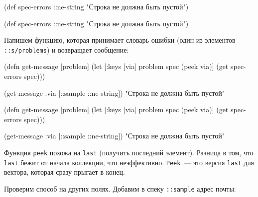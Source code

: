 \label{spec-errors}

\ifx\DEVICETYPE\MOBILE

  \begin{clojure}
(def spec-errors
  {::ne-string
   "Строка не должна быть пустой"})
  \end{clojure}

\else

  \begin{clojure}
(def spec-errors
  {::ne-string "Строка не должна быть пустой"})
  \end{clojure}

\fi

\mnoindent
Напишем функцию, которая принимает словарь ошибки (один из элементов
\verb|::s/problems|) и возвращает сообщение:


\ifx\DEVICETYPE\MOBILE

  \begin{clojure}
(defn get-message [problem]
  (let [{:keys [via]} problem
        spec (peek via)]
    (get spec-errors spec)))

(get-message {:via [::sample
                    ::ne-string]})
"Строка не должна быть пустой"
  \end{clojure}

\else

  \begin{clojure}
(defn get-message [problem]
  (let [{:keys [via]} problem
        spec (peek via)]
    (get spec-errors spec)))

(get-message {:via [::sample ::ne-string]})
"Строка не должна быть пустой"
  \end{clojure}

\fi

Функция \verb|peek| похожа на \verb|last| (получить последний
элемент). Разница в том, что \verb|last| бежит от начала коллекции, что
неэффективно. \verb|Peek|~--- это версия \verb|last| для вектора, которая сразу
прыгает в конец.

Проверим способ на других полях. Добавим в спеку \verb|::sample| адрес почты:

